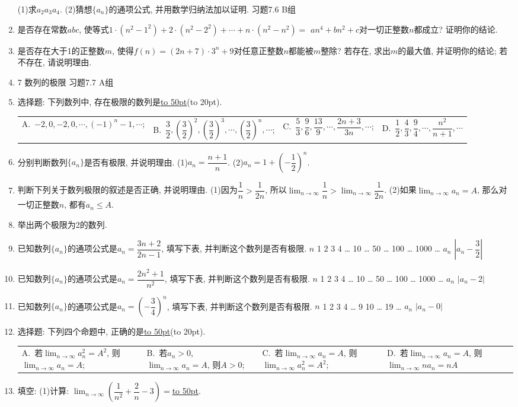 \documentclass[10pt,a4paper]{article}
\newcommand{\blank}[1]{\underline{\hbox to #1pt{}}}
\newcommand{\bracket}[1]{(\hbox to #1pt{})}
\newcommand{\fourch}[4]{\par\begin{tabular}{p{.23\textwidth}p{.23\textwidth}p{.23\textwidth}p{.23\textwidth}}
A.~#1 &B.~#2& C.~#3& D.~#4
\end{tabular}}
\begin{document}
\begin{enumerate}[1.]
(1)求$a_2a_3a_4$.
(2)猜想$\{a_n\}$的通项公式, 并用数学归纳法加以证明.
习题7.6  B组
\item 是否存在常数$abc$, 使等式$1\cdot (n^2-1^2)+2\cdot (n^2-2^2)+\cdots +n\cdot (n^2-n^2)=$ $an^4+bn^2+c$对一切正整数$n$都成立? 证明你的结论.
\item 是否存在大于1的正整数$m$, 使得$f(n)=(2n+7)\cdot 3^n+9$对任意正整数$n$都能被$m$整除? 若存在, 求出$m$的最大值, 并证明你的结论; 若不存在, 请说明理由.
\item 7  数列的极限
习题7.7  A组
\item 选择题:
下列数列中, 存在极限的数列是\blank{50}\bracket{20}.
\fourch{$-2,0,-2,0,\cdots ,(-1)^n-1,\cdots$;}{$\dfrac 32,(\dfrac 32)^2,(\dfrac 32)^3,\cdots ,(\dfrac 32)^n,\cdots$;}{$\dfrac 53,\dfrac 96,\dfrac{13}9,\cdots ,\dfrac{2n+3}{3n},\cdots$;}{$\dfrac 12,\dfrac 43,\dfrac 94,\cdots ,\dfrac{n^2}{n+1},\cdots$}
\item 分别判断数列$\{a_n\}$是否有极限, 并说明理由.
(1)$a_n=\dfrac{n+1}n$.
(2)$a_n=1+(-\dfrac 12)^n$.
\item 判断下列关于数列极限的叙述是否正确, 并说明理由.
(1)因为$\dfrac 1n>\dfrac 1{2n}$, 所以$\displaystyle\lim_{n\to\infty}\dfrac 1n>\displaystyle\lim_{n\to\infty}\dfrac 1{2n}$.
(2)如果$\displaystyle\lim_{n\to\infty}a_n=A$, 那么对一切正整数$n$, 都有$a_n\le A$.
\item 举出两个极限为2的数列.
\item 已知数列$\{a_n\}$的通项公式是$a_n=\dfrac{3n+2}{2n-1}$, 填写下表, 并判断这个数列是否有极限.
$n$	1	2	3	4	…	10	…	50	…	100	…	1000	…
$a_n$													
$|a_n-\dfrac 32|$													
\item 已知数列$\{a_n\}$的通项公式是$a_n=\dfrac{2{n^2}+1}{n^2}$, 填写下表, 并判断这个数列是否有极限.
$n$	1	2	3	4	…	10	…	50	…	100	…	1000	…
$a_n$													
$|a_n-2|$													
\item 已知数列$\{a_n\}$的通项公式是$a_n=(-\dfrac 34)^n$, 填写下表, 并判断这个数列是否有极限.
$n$	1	2	3	4	…	9	10	…		19	…
$a_n$											
$|a_n-0|$											
\item 选择题:
下列四个命题中, 正确的是\blank{50}\bracket{20}.
\fourch{若$\displaystyle\lim_{n\to\infty}a_n^2=A^2$, 则$\displaystyle\lim_{n\to\infty}a_n=A$;}{若$a_n>0$, $\displaystyle\lim_{n\to\infty}a_n=A$, 则$A>0$;}{若$\displaystyle\lim_{n\to\infty}a_n=A$, 则$\displaystyle\lim_{n\to\infty}a_n^2=A^2$;}{若$\displaystyle\lim_{n\to\infty}a_n=A$, 则$\displaystyle\lim_{n\to\infty}na_n=nA$}
\item 填空:
(1)计算: $\displaystyle\lim_{n\to\infty}(\dfrac 1{n^2}+\dfrac 2n-3)=$\blank{50}.

\end{enumerate}
\end{document}
